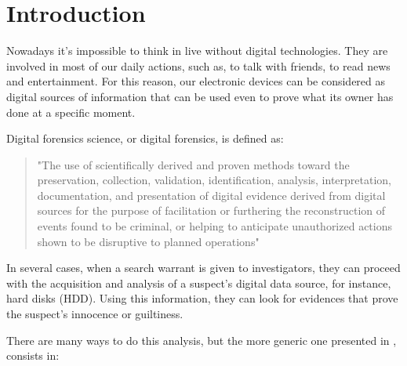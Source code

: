 \cleardoublepage
{}
\chapter*{Introduction}

Nowadays it's impossible to think in live without digital technologies. They
are involved in most of our daily actions, such as, to talk with friends, to
read news and entertainment. For this reason, our electronic devices can be
considered as digital sources of information that can be used even to prove
what its owner has done at a specific moment.

Digital forensics science, or digital forensics, is defined as:

\begin{quote}
"The use of scientifically derived and proven methods toward the preservation,
collection, validation, identification, analysis, interpretation,
documentation, and presentation of digital evidence derived from digital
sources for the purpose of facilitation or furthering the reconstruction of
events found to be criminal, or helping to anticipate unauthorized actions
shown to be disruptive to planned operations" \cite{DFRWS-df-road-map}
\end{quote}

In several cases, when a search warrant is given to investigators, they can
proceed with the acquisition and analysis of a suspect's digital data source,
for instance, hard disks (HDD). Using this information, they can look for
evidences that prove the suspect's innocence or guiltiness.

There are many ways to do this analysis, but the more generic one presented in
\cite{ds-phases}, consists in:

